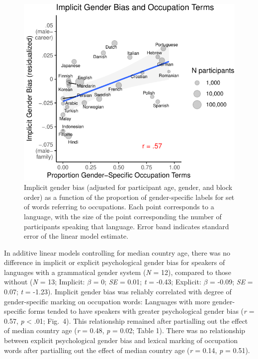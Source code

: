 \documentclass[9pt,twocolumn,twoside]{pnas-new}
\begin{document}
\begin{figure}
\centering
\includegraphics[width=.8\linewidth]{pnas_rmd/iat_lang_pnas_files/figure-latex/unnamed-chunk-14-1.pdf}
\caption{\label{fig:unnamed-chunk-14}Implicit gender bias (adjusted for participant age,
gender, and block order) as a function of the proportion of gender-specific
labels for set of words referring to occupations. Each point corresponds
to a language, with the size of the point corresponding the number of
participants speaking that language. Error band indicates standard error
of the linear model estimate.}
\end{figure}

In additive linear models controlling for median country age, there was
no difference in implicit or explicit psychological gender bias for
speakers of languages with a grammatical gender system (\emph{N} = 12),
compared to those without (\emph{N} = 13; Implicit: \(\beta\) = 0;
\emph{SE} = 0.01; \emph{t} = -0.43; Explicit: \(\beta\) = -0.09;
\emph{SE} = 0.07; \emph{t} = -1.23).  Implicit gender
bias was reliably correlated with degree of gender-specific marking on
occupation words: Languages with more gender-specific forms tended to
have speakers with greater psychological gender bias (\emph{r} = 0.57,
\emph{p} \textless{} .01; Fig.\ 4). This relationship remained after partialling out the effect of
median country age (\emph{r} = 0.48, \emph{p} = 0.02; Table 1). There
was no relationship between explicit psychological gender bias and
lexical marking of occupation words after partialling out the effect of
median country age (\emph{r} = 0.14, \emph{p} = 0.51).
\end{document}
